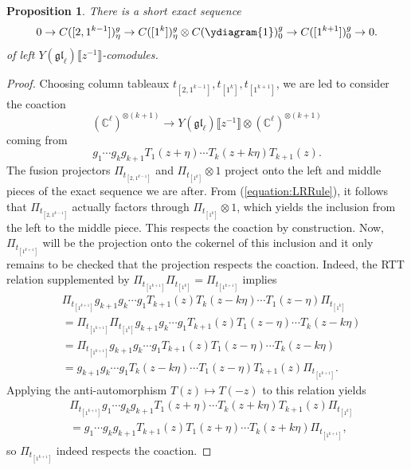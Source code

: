 \documentclass[11pt]{report}
\newtheorem{prop}[theorem]{Proposition}
\theoremstyle{definition}
\theoremstyle{remark}
\theoremstyle{remark}
\newcommand{\C}{\mathbb{C}}
\begin{document}
\begin{prop}
There is a short exact sequence
\begin{equation*}
0 \to C([2,1^{k-1}])_\eta^g \to C([1^k])_\eta^g \otimes C(\ydiagram{1})_0^g \to C([1^{k+1}])_0^g \to 0.
\end{equation*}
of left $Y(\mathfrak{gl}_\ell)\llbracket z^{-1} \rrbracket$-comodules.
\end{prop}

\begin{proof}
Choosing column tableaux $t_{[2,1^{k-1}]},t_{[1^k]},t_{[1^{k+1}]}$, we are led to consider the coaction
\begin{equation*}
(\C^\ell)^{\otimes (k+1)} \to Y(\mathfrak{gl}_\ell)\llbracket z^{-1} \rrbracket \otimes (\C^\ell)^{\otimes (k+1)}
\end{equation*}
coming from
\begin{equation*}
g_1 \cdots g_k g_{k+1} T_1(z+\eta) \cdots T_k(z+k\eta) T_{k+1}(z).
\end{equation*}
The fusion projectors $\Pi_{t_{[2,1^{k-1}]}}$ and $\Pi_{t_{[1^k]}} \otimes 1$ project onto the left and middle pieces of the exact sequence we are after. From (\ref{equation:LRRule}), it follows that $\Pi_{t_{[2,1^{k-1}]}}$ actually factors through $\Pi_{t_{[1^k]}} \otimes 1$, which yields the inclusion from the left to the middle piece. This respects the coaction by construction. Now, $\Pi_{t_{[1^{k+1}]}}$ will be the projection onto the cokernel of this inclusion and it only remains to be checked that the projection respects the coaction. Indeed, the RTT relation supplemented by $\Pi_{t_{[1^{k+1}]}} \Pi_{t_{[1^k]}} = \Pi_{t_{[1^{k+1}]}}$ implies
\begin{align*}
&\Pi_{t_{[1^{k+1}]}} g_{k+1} g_k \cdots g_1 T_{k+1}(z) T_k(z-k\eta) \cdots T_1(z-\eta) \Pi_{t_{[1^k]}} \\
&= \Pi_{t_{[1^{k+1}]}} \Pi_{t_{[1^k]}} g_{k+1} g_k \cdots g_1 T_{k+1}(z) T_1(z-\eta) \cdots T_k(z-k\eta) \\
&= \Pi_{t_{[1^{k+1}]}} g_{k+1} g_k \cdots g_1 T_{k+1}(z) T_1(z-\eta) \cdots T_k(z-k\eta) \\
&= g_{k+1} g_k \cdots g_1 T_k(z-k\eta) \cdots T_1(z-\eta) T_{k+1}(z) \Pi_{t_{[1^{k+1}]}}.
\end{align*}
Applying the anti-automorphism $T(z) \mapsto T(-z)$ to this relation yields
\begin{align*}
&\Pi_{t_{[1^{k+1}]}} g_1 \cdots g_k g_{k+1} T_1(z+\eta) \cdots T_k(z+k\eta) T_{k+1}(z) \Pi_{t_{[1^k]}} \\
&= g_1 \cdots g_k g_{k+1} T_{k+1}(z) T_1(z+\eta) \cdots T_k(z+k\eta) \Pi_{t_{[1^{k+1}]}},
\end{align*}
so $\Pi_{t_{[1^{k+1}]}}$ indeed respects the coaction.
\end{proof}
\end{document}
